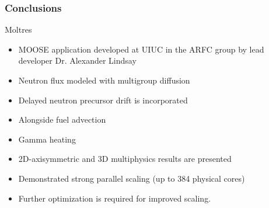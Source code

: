 \begin{frame}
  \frametitle{Conclusions}
		\begin{block}{Moltres}
		\begin{itemize}
                        \item \gls{MOOSE} application developed at \gls{UIUC} 
                                in the \gls{ARFC} group by lead developer Dr. 
                                Alexander Lindsay
                        \item Neutron flux modeled with multigroup diffusion
                        \item Delayed neutron precursor drift is incorporated
                        \item Alongside fuel advection
                        \item Gamma heating
                        \item 2D-axisymmetric and 3D multiphysics results are presented
                        \item Demonstrated strong parallel scaling (up to 384 physical cores) 
                \item Further optimization is required for improved scaling.
        \end{itemize}
        \end{block}
        
\end{frame}

